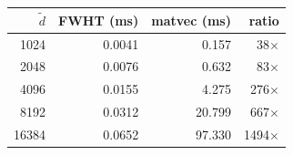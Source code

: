 \begin{tabular}{@{}rrrr@{}}
\toprule
$\tilde{d}$ & FWHT (ms) & matvec (ms) & ratio \\
\midrule
1024 & 0.0041 & 0.157 & 38$\times$ \\
2048 & 0.0076 & 0.632 & 83$\times$ \\
4096 & 0.0155 & 4.275 & 276$\times$ \\
8192 & 0.0312 & 20.799 & 667$\times$ \\
16384 & 0.0652 & 97.330 & 1494$\times$ \\
\bottomrule
\end{tabular}
